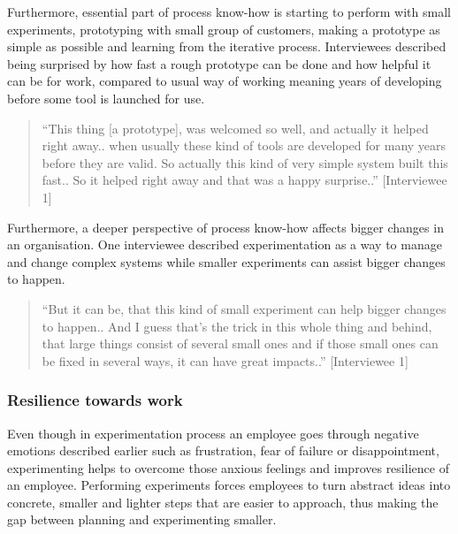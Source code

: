Furthermore, essential part of process know-how is starting to perform with small experiments, prototyping with small group of customers, making a prototype as simple as possible and learning from the iterative process. Interviewees described being surprised by how fast a rough prototype can be done and how helpful it can be for work, compared to usual way of working meaning years of developing before some tool is launched for use. 
\begin{quote}
``This thing [a prototype], was welcomed so well, and actually it helped right away.. when usually these kind of tools are developed for many years before they are valid. So actually this kind of very simple system built this fast.. So it helped right away and that was a happy surprise..'' [Interviewee 1]
\end{quote}
Furthermore, a deeper perspective of process know-how affects bigger changes in an organisation. One interviewee described experimentation as a way to manage and change complex systems while smaller experiments can assist bigger changes to happen. 
\begin{quote}
``But it can be, that this kind of small experiment can help bigger changes to happen.. And I guess that's the trick in this whole thing and behind, that large things consist of several small ones and if those small ones can be fixed in several ways, it can have great impacts..'' [Interviewee 1]
\end{quote}

\subsubsection{Resilience towards work}
Even though in experimentation process an employee goes through negative emotions described earlier such as frustration, fear of failure or disappointment, experimenting helps to overcome those anxious feelings and improves resilience of an employee.  Performing experiments forces employees to turn abstract ideas into concrete, smaller and lighter steps that are easier to approach, thus making the gap between planning and experimenting smaller.  

